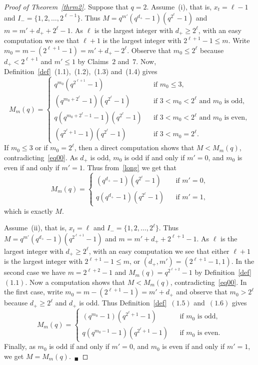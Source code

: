 \documentclass{amsart}
\begin{document}
\begin{proof}[Proof of Theorem~\ref{thrm2}]
Suppose that $q=2$. Assume~(i), that is, $x_t=\ell-1$ and $I_-=\{1,2,\ldots,2^{\ell-1}\}$. Thus $M=q^{m'}(q^{d_+}-1)(q^{2^\ell}-1)$ and $m=m'+d_++2^\ell-1$. As $\ell$ is the largest integer with $d_+\geq 2^\ell$, with an easy computation we see that $\ell+1$ is the largest integer with $2^{\ell+1}-1\leq m$. Write $m_0=m-(2^{\ell+1}-1)=m'+d_+-2^\ell$. Observe that $m_0\leq 2^\ell$ because $d_+<2^{\ell+1}$ and $m'\leq 1$ by Claims~$2$ and~$7$. Now, Definition~\ref{def}~(1.1),~(1.2),~(1.3) and~(1.4) gives
\begin{equation}\label{long}
M_m(q)=\left\{
\begin{array}{lcl}
q^{m_0}(q^{2^{\ell+1}}-1)&&\textrm{if }m_0\leq 3,\\
(q^{m_0+2^\ell}-1)(q^{2^{\ell}}-1)&&\textrm{if }3<m_0<2^\ell \textrm{ and }m_0 \textrm{ is odd},\\
q(q^{m_0+2^\ell-1}-1)(q^{2^{\ell}}-1)&&\textrm{if }3<m_0<2^\ell \textrm{ and }m_0 \textrm{ is even},\\
(q^{2^\ell+1}-1)(q^{2^{\ell}}-1)&&\textrm{if } 3<m_0=2^\ell.
\end{array}
\right.
\end{equation}
If $m_0\leq 3$ or if $m_0=2^\ell$, then a direct computation shows that $M<M_m(q)$, contradicting~\eqref{eq00}. As $d_+$ is odd, $m_0$ is odd if and only if $m'=0$, and $m_0$ is even if and only if $m'=1$. Thus from~\eqref{long} we get that 
\[
M_m(q)=\left\{
\begin{array}{lcl}
(q^{d_+}-1)(q^{2^\ell}-1)&&\textrm{if }m'=0,\\
q(q^{d_+}-1)(q^{2^\ell}-1)&&\textrm{if }m'=1,
\end{array}
\right.
\]
which is exactly $M$.

Assume~(ii), that is, $x_t=\ell$ and $I_-=\{1,2,\ldots,2^\ell\}$. Thus $M=q^{m'}(q^{d_+}-1)(q^{2^{\ell+1}}-1)$ and $m=m'+d_++2^{\ell+1}-1$. As $\ell$ is the largest integer with $d_+\geq 2^\ell$, with an easy computation we see that either $\ell+1$ is the largest integer with $2^{\ell+1}-1\leq m$, or $(d_+,m')=(2^{\ell+1}-1,1)$. In the second case we have $m=2^{\ell+2}-1$ and $M_m(q)=q^{2^{\ell+2}}-1$ by Definition~\ref{def}~$(1.1)$. Now a computation shows that $M<M_m(q)$, contradicting~\eqref{eq00}. In the first case, write $m_0=m-(2^{\ell+1}-1)=m'+d_+$ and observe that $m_0>2^\ell$ because $d_+\geq 2^\ell$ and $d_+$ is odd. Thus Definition~\ref{def}~$(1.5)$ and~$(1.6)$ gives
\[
M_m(q)=\left\{
\begin{array}{lcl}
(q^{m_0}-1)(q^{2^\ell+1}-1)&&\textrm{if }m_0 \textrm{ is odd},\\
q(q^{m_0-1}-1)(q^{2^\ell+1}-1)&&\textrm{if }m_0 \textrm{ is even}.
\end{array}
\right.
\]
Finally, as $m_0$ is odd if and only if $m'=0$, and $m_0$ is even if and only if $m'=1$, we get $M=M_m(q)$.~$_\blacksquare$


\end{proof}
\end{document}
